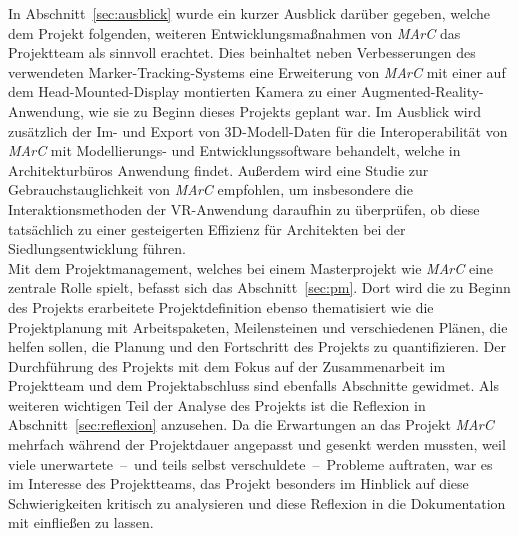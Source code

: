 In Abschnitt~\ref{sec:ausblick} wurde ein kurzer Ausblick darüber gegeben, welche dem Projekt folgenden, weiteren Entwicklungsmaßnahmen von \emph{MArC} das Projektteam als sinnvoll erachtet. Dies beinhaltet neben Verbesserungen des verwendeten Marker-Tracking-Systems eine Erweiterung von \emph{MArC} mit einer auf dem Head-Mounted-Display montierten Kamera zu einer Augmented-Reality-Anwendung, wie sie zu Beginn dieses Projekts geplant war. Im Ausblick wird zusätzlich der Im- und Export von 3D-Modell-Daten für die Interoperabilität von \emph{MArC} mit Modellierungs- und Entwicklungssoftware behandelt, welche in Architekturbüros Anwendung findet. Außerdem wird eine Studie zur Gebrauchstauglichkeit von \emph{MArC} empfohlen, um insbesondere die Interaktionsmethoden der VR-Anwendung daraufhin zu überprüfen, ob diese tatsächlich zu einer gesteigerten Effizienz für Architekten bei der Siedlungsentwicklung führen.\\
Mit dem Projektmanagement, welches bei einem Masterprojekt wie \emph{MArC} eine zentrale Rolle spielt, befasst sich das Abschnitt~\ref{sec:pm}. Dort wird die zu Beginn des Projekts erarbeitete Projektdefinition ebenso thematisiert wie die Projektplanung mit Arbeitspaketen, Meilensteinen und verschiedenen Plänen, die helfen sollen, die Planung und den Fortschritt des Projekts zu quantifizieren. Der Durchführung des Projekts mit dem Fokus auf der Zusammenarbeit im Projektteam und dem Projektabschluss sind ebenfalls Abschnitte gewidmet. Als weiteren wichtigen Teil der Analyse des Projekts ist die Reflexion in Abschnitt~\ref{sec:reflexion} anzusehen. Da die Erwartungen an das Projekt \emph{MArC} mehrfach während der Projektdauer angepasst und gesenkt werden mussten, weil viele unerwartete~--~und teils selbst verschuldete~--~Probleme auftraten, war es im Interesse des Projektteams, das Projekt besonders im Hinblick auf diese Schwierigkeiten kritisch zu analysieren und diese Reflexion in die Dokumentation mit einfließen zu lassen.
